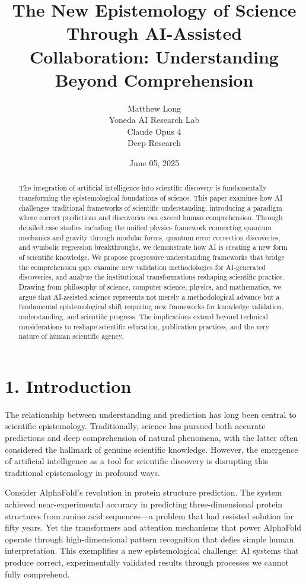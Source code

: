 \documentclass{article}
\title{The New Epistemology of Science Through AI-Assisted Collaboration: Understanding Beyond Comprehension}
\author{
  Matthew Long \\
  Yoneda AI Research Lab \\
  \And
  Claude Opus 4 \\
  Deep Research \\
}
\date{June 05, 2025}
\begin{document}
\maketitle

\begin{abstract}
The integration of artificial intelligence into scientific discovery is fundamentally transforming the epistemological foundations of science. This paper examines how AI challenges traditional frameworks of scientific understanding, introducing a paradigm where correct predictions and discoveries can exceed human comprehension. Through detailed case studies including the unified physics framework connecting quantum mechanics and gravity through modular forms, quantum error correction discoveries, and symbolic regression breakthroughs, we demonstrate how AI is creating a new form of scientific knowledge. We propose progressive understanding frameworks that bridge the comprehension gap, examine new validation methodologies for AI-generated discoveries, and analyze the institutional transformations reshaping scientific practice. Drawing from philosophy of science, computer science, physics, and mathematics, we argue that AI-assisted science represents not merely a methodological advance but a fundamental epistemological shift requiring new frameworks for knowledge validation, understanding, and scientific progress. The implications extend beyond technical considerations to reshape scientific education, publication practices, and the very nature of human scientific agency.
\end{abstract}

\section{1. Introduction}

The relationship between understanding and prediction has long been central to scientific epistemology. Traditionally, science has pursued both accurate predictions and deep comprehension of natural phenomena, with the latter often considered the hallmark of genuine scientific knowledge. However, the emergence of artificial intelligence as a tool for scientific discovery is disrupting this traditional epistemology in profound ways.


Consider AlphaFold's revolution in protein structure prediction. The system achieved near-experimental accuracy in predicting three-dimensional protein structures from amino acid sequences—a problem that had resisted solution for fifty years. Yet the transformers and attention mechanisms that power AlphaFold operate through high-dimensional pattern recognition that defies simple human interpretation. This exemplifies a new epistemological challenge: AI systems that produce correct, experimentally validated results through processes we cannot fully comprehend.
\end{document}
